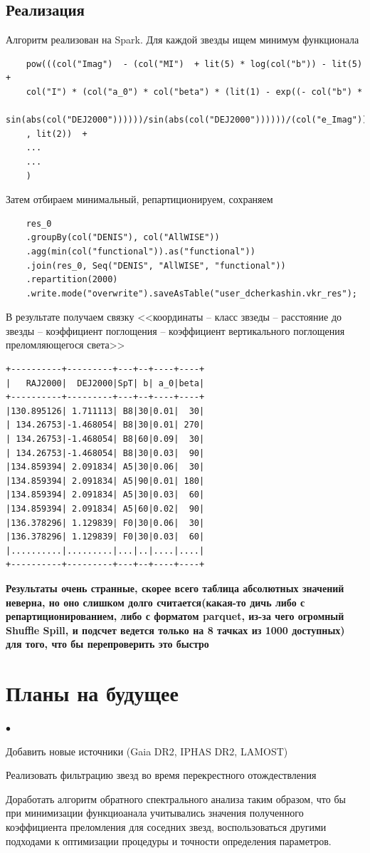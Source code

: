 \documentclass[12pt, a4paper]{article}
\newenvironment{compactlist}{
    \begin{list}{{$\bullet$}}{
      \setlength\partopsep{0pt}
      \setlength\parskip{0pt}
      \setlength\parsep{0pt}
      \setlength\topsep{0pt}
      \setlength\itemsep{0pt}
} }{
\end{list} }
\begin{document}
	\subsection*{Реализация}
	Алгоритм реализован на Spark. Для каждой звезды ищем минимум функционала
	\begin{verbatim}
    pow(((col("Imag")  - (col("MI")  + lit(5) * log(col("b")) - lit(5) +
    col("I") * (col("a_0") * col("beta") * (lit(1) - exp((- col("b") *
    sin(abs(col("DEJ2000"))))))/sin(abs(col("DEJ2000"))))))/(col("e_Imag")))
    , lit(2))  +
    ...
    ...
    )
    \end{verbatim}
	Затем отбираем минимальный, репартиционируем, сохраняем
	\begin{verbatim}
	res_0
	.groupBy(col("DENIS"), col("AllWISE"))
	.agg(min(col("functional")).as("functional"))
	.join(res_0, Seq("DENIS", "AllWISE", "functional"))
	.repartition(2000)
	.write.mode("overwrite").saveAsTable("user_dcherkashin.vkr_res");
	\end{verbatim}
	В результате получаем связку <<координаты -- класс звзеды -- расстояние до звезды -- коэффициент поглощения -- коэффициент вертикального поглощения преломляющегося света>>
	\begin{verbatim}
+----------+---------+---+--+----+----+
|   RAJ2000|  DEJ2000|SpT| b| a_0|beta|
+----------+---------+---+--+----+----+
|130.895126| 1.711113| B8|30|0.01|  30|
| 134.26753|-1.468054| B8|30|0.01| 270|
| 134.26753|-1.468054| B8|60|0.09|  30|
| 134.26753|-1.468054| B8|30|0.03|  90|
|134.859394| 2.091834| A5|30|0.06|  30|
|134.859394| 2.091834| A5|90|0.01| 180|
|134.859394| 2.091834| A5|30|0.03|  60|
|134.859394| 2.091834| A5|60|0.02|  90|
|136.378296| 1.129839| F0|30|0.06|  30|
|136.378296| 1.129839| F0|30|0.03|  60|
|..........|.........|...|..|....|....|
+----------+---------+---+--+----+----+
\end{verbatim}
\textbf{Результаты очень странные, скорее всего таблица абсолютных значений неверна, но оно слишком долго считается(какая-то дичь либо с репартиционированием, либо с форматом parquet, из-за чего огромный Shuffle Spill, и подсчет ведется только на 8 тачках из 1000 доступных) для того, что бы перепроверить это быстро}
	\section{Планы на будущее}
	\begin{compactlist}
		\item Добавить новые источники (Gaia DR2, IPHAS DR2, LAMOST)
		\item Реализовать фильтрацию звезд во время перекрестного отождествления
		\item Доработать алгоритм обратного спектрального анализа таким образом, что бы при минимизации функциоанала учитывались значения полученного коэффициента преломления для соседних звезд, воспользоваться другими подходами к оптимизации процедуры и точности определения параметров.
	\end{compactlist}
\end{document}
